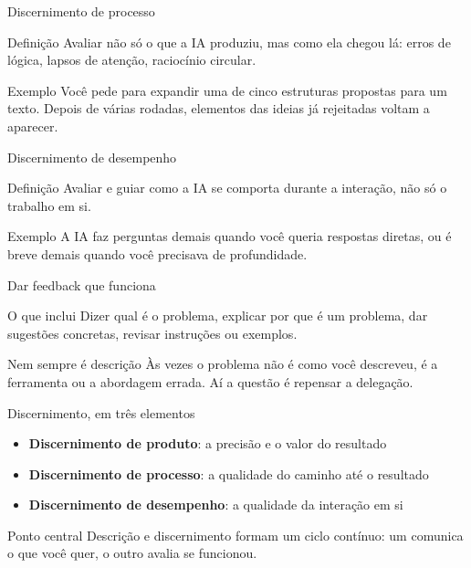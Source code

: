 \documentclass[aspectratio=169,11pt]{beamer}
\begin{document}
\begin{frame}{Discernimento de processo}
  \begin{notebox}{Definição}
    \small Avaliar não só o que a IA produziu, mas como ela chegou lá: erros de lógica, lapsos de atenção, raciocínio circular.
  \end{notebox}
  \vspace{0.25cm}
  \begin{alertbox}{Exemplo}
    \small Você pede para expandir uma de cinco estruturas propostas para um texto. Depois de várias rodadas, elementos das ideias já rejeitadas voltam a aparecer.
  \end{alertbox}
\end{frame}

\begin{frame}{Discernimento de desempenho}
  \begin{notebox}{Definição}
    \small Avaliar e guiar como a IA se comporta durante a interação, não só o trabalho em si.
  \end{notebox}
  \vspace{0.25cm}
  \begin{alertbox}{Exemplo}
    \small A IA faz perguntas demais quando você queria respostas diretas, ou é breve demais quando você precisava de profundidade.
  \end{alertbox}
\end{frame}

\begin{frame}{Dar feedback que funciona}
  \begin{notebox}{O que inclui}
    \small Dizer qual é o problema, explicar por que é um problema, dar sugestões concretas, revisar instruções ou exemplos.
  \end{notebox}
  \vspace{0.25cm}
  \begin{alertbox}{Nem sempre é descrição}
    \small Às vezes o problema não é como você descreveu, é a ferramenta ou a abordagem errada. Aí a questão é repensar a delegação.
  \end{alertbox}
\end{frame}

\begin{frame}{Discernimento, em três elementos}
  \begin{itemize}
    \item \textbf{Discernimento de produto}: a precisão e o valor do resultado
    \item \textbf{Discernimento de processo}: a qualidade do caminho até o resultado
    \item \textbf{Discernimento de desempenho}: a qualidade da interação em si
  \end{itemize}
  \vspace{0.3cm}
  \begin{alertbox}{Ponto central}
    \small Descrição e discernimento formam um ciclo contínuo: um comunica o que você quer, o outro avalia se funcionou.
  \end{alertbox}
\end{frame}
\end{document}
